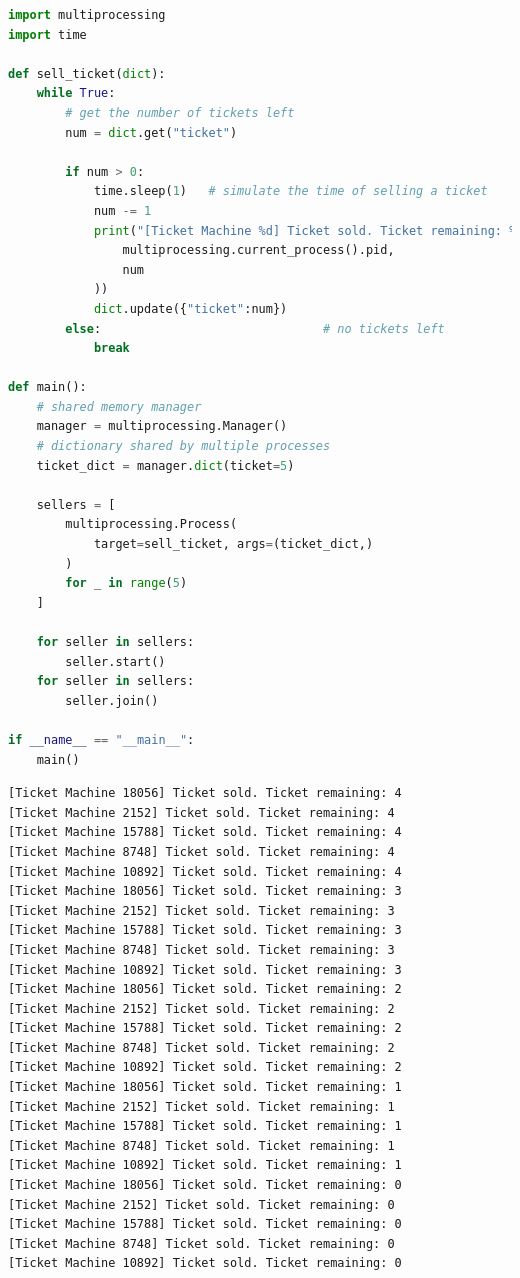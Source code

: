 \begin{lstlisting}[language=Python]
import multiprocessing
import time

def sell_ticket(dict):
    while True:
        # get the number of tickets left
        num = dict.get("ticket")
        
        if num > 0:
            time.sleep(1)   # simulate the time of selling a ticket
            num -= 1
            print("[Ticket Machine %d] Ticket sold. Ticket remaining: %d" % (
                multiprocessing.current_process().pid,
                num
            ))
            dict.update({"ticket":num})
        else:                               # no tickets left
            break

def main():
    # shared memory manager
    manager = multiprocessing.Manager()
    # dictionary shared by multiple processes
    ticket_dict = manager.dict(ticket=5)

    sellers = [
        multiprocessing.Process(
            target=sell_ticket, args=(ticket_dict,)
        ) 
        for _ in range(5)
    ]

    for seller in sellers:
        seller.start()
    for seller in sellers:
        seller.join()

if __name__ == "__main__":
    main()
\end{lstlisting}

\begin{tcolorbox}
    \begin{verbatim}
[Ticket Machine 18056] Ticket sold. Ticket remaining: 4
[Ticket Machine 2152] Ticket sold. Ticket remaining: 4
[Ticket Machine 15788] Ticket sold. Ticket remaining: 4
[Ticket Machine 8748] Ticket sold. Ticket remaining: 4
[Ticket Machine 10892] Ticket sold. Ticket remaining: 4
[Ticket Machine 18056] Ticket sold. Ticket remaining: 3
[Ticket Machine 2152] Ticket sold. Ticket remaining: 3 
[Ticket Machine 15788] Ticket sold. Ticket remaining: 3
[Ticket Machine 8748] Ticket sold. Ticket remaining: 3 
[Ticket Machine 10892] Ticket sold. Ticket remaining: 3
[Ticket Machine 18056] Ticket sold. Ticket remaining: 2
[Ticket Machine 2152] Ticket sold. Ticket remaining: 2 
[Ticket Machine 15788] Ticket sold. Ticket remaining: 2
[Ticket Machine 8748] Ticket sold. Ticket remaining: 2 
[Ticket Machine 10892] Ticket sold. Ticket remaining: 2
[Ticket Machine 18056] Ticket sold. Ticket remaining: 1
[Ticket Machine 2152] Ticket sold. Ticket remaining: 1
[Ticket Machine 15788] Ticket sold. Ticket remaining: 1
[Ticket Machine 8748] Ticket sold. Ticket remaining: 1
[Ticket Machine 10892] Ticket sold. Ticket remaining: 1
[Ticket Machine 18056] Ticket sold. Ticket remaining: 0
[Ticket Machine 2152] Ticket sold. Ticket remaining: 0
[Ticket Machine 15788] Ticket sold. Ticket remaining: 0
[Ticket Machine 8748] Ticket sold. Ticket remaining: 0
[Ticket Machine 10892] Ticket sold. Ticket remaining: 0
	\end{verbatim}
\end{tcolorbox}

